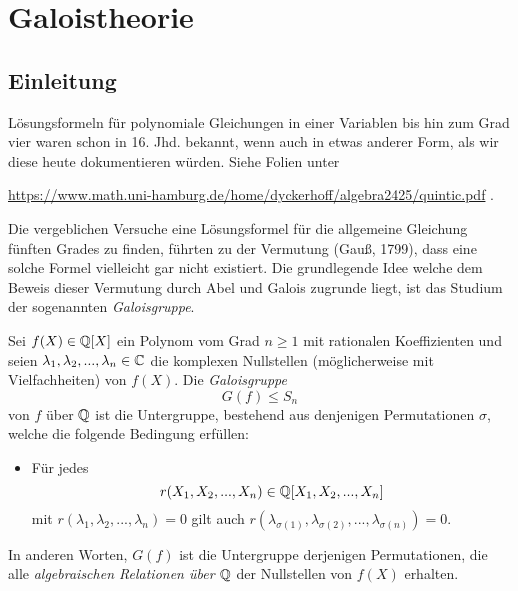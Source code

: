 \documentclass{book}
\begin{document}
\chapter{Galoistheorie}

\section{Einleitung}%

Lösungsformeln für polynomiale Gleichungen in einer Variablen bis hin zum Grad
vier waren schon in 16. Jhd. bekannt, wenn auch in etwas anderer Form, als wir
diese heute dokumentieren würden. Siehe Folien unter
\begin{center}
\url{https://www.math.uni-hamburg.de/home/dyckerhoff/algebra2425/quintic.pdf} .
\end{center}

Die vergeblichen Versuche eine Lösungsformel für die allgemeine Gleichung
fünften Grades zu finden, führten zu der Vermutung (Gauß, 1799), dass eine
solche Formel vielleicht gar nicht existiert. Die grundlegende Idee welche dem
Beweis dieser Vermutung durch Abel und Galois zugrunde liegt, ist das Studium
der sogenannten \emph{Galoisgruppe}.

\begin{defi}
    \label{defi:galoisgruppe}
    Sei $f(X) \in \mathbb{Q}[X]$ ein Polynom vom Grad $n \ge 1$ mit rationalen Koeffizienten und seien
    $\lambda_1, \lambda_2, ..., \lambda_n \in \mathbb{C}$ die komplexen Nullstellen (möglicherweise mit Vielfachheiten) von
    $f(X)$. Die \emph{Galoisgruppe}
    \[
        G(f) \le S_n
    \]
    von $f$ über $\mathbb{Q}$ ist die Untergruppe, bestehend aus denjenigen
    Permutationen $\sigma$, welche die folgende Bedingung erfüllen:
    \begin{itemize}
        \item Für jedes
            \[
                r(X_1, X_2, ..., X_n) \in \mathbb{Q}[X_1,X_2, ..., X_n]
            \]
            mit $r(\lambda_1, \lambda_2, ..., \lambda_n) = 0$ gilt auch
            $r(\lambda_{\sigma(1)}, \lambda_{\sigma(2)}, ..., \lambda_{\sigma(n)})
            = 0$. 
    \end{itemize}
    In anderen Worten, $G(f)$ ist die Untergruppe derjenigen Permutationen, die
    alle \emph{algebraischen Relationen über $\mathbb{Q}$} der Nullstellen von $f(X)$
    erhalten.
\end{defi}
\end{document}
